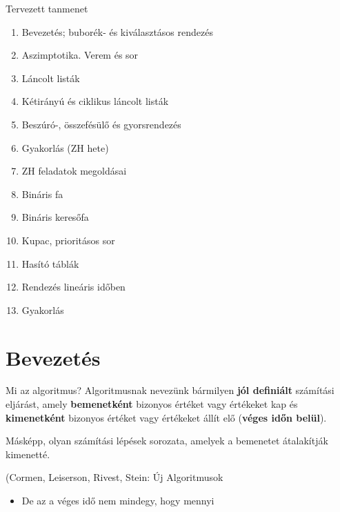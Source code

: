 \documentclass[hungarian]{beamer}
\begin{document}
\begin{frame}{Tervezett tanmenet}
\begin{enumerate}
    \item Bevezetés; buborék- és kiválasztásos rendezés
    \item Aszimptotika. Verem és sor
    \item Láncolt listák
    \item Kétirányú és ciklikus láncolt listák
    \item Beszúró-, összefésülő és gyorsrendezés
    \item Gyakorlás (ZH hete)
    \item ZH feladatok megoldásai
    \vspace{3mm}
    \item Bináris fa
    \item Bináris keresőfa
    \item Kupac, prioritásos sor
    \item Hasító táblák
    \item Rendezés lineáris időben
    \item Gyakorlás
\end{enumerate}
\end{frame}

\section{Bevezetés}

\begin{frame}{Mi az algoritmus?}
Algoritmusnak nevezünk bármilyen \textbf{jól definiált} számítási eljárást, amely \textbf{bemenetként} bizonyos értéket vagy értékeket kap és \textbf{kimenetként} bizonyos értéket vagy értékeket állít elő (\textbf{véges időn belül}).

\vspace{5mm}

Másképp, olyan számítási lépések sorozata, amelyek a bemenetet átalakítják kimenetté.

{\scriptsize (Cormen, Leiserson, Rivest, Stein: Új Algoritmusok}
\vspace{5mm}
\begin{itemize}
    \item De az a véges idő nem mindegy, hogy mennyi
\end{itemize}
\end{frame}
\end{document}
